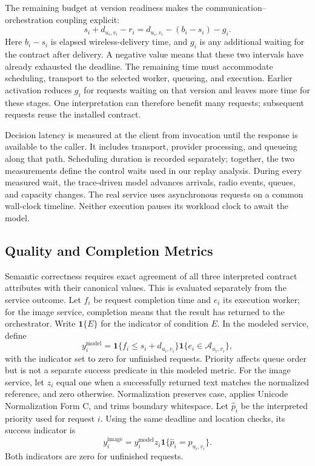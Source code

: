 The remaining budget at version readiness makes the communication--orchestration coupling explicit:
\begin{equation}
s_i+d_{u_i,v_i}-r_i
=d_{u_i,v_i}-(b_i-s_i)-g_i.
\label{eq:remaining-budget}
\end{equation}
Here $b_i-s_i$ is elapsed wireless-delivery time, and $g_i$ is any additional waiting for the contract after delivery. A negative value means that these two intervals have already exhausted the deadline. The remaining time must accommodate scheduling, transport to the selected worker, queueing, and execution. Earlier activation reduces $g_i$ for requests waiting on that version and leaves more time for these stages. One interpretation can therefore benefit many requests; subsequent requests reuse the installed contract.

Decision latency is measured at the client from invocation until the response is available to the caller. It includes transport, provider processing, and queueing along that path. Scheduling duration is recorded separately; together, the two measurements define the control waits used in our replay analysis. During every measured wait, the trace-driven model advances arrivals, radio events, queues, and capacity changes. The real service uses asynchronous requests on a common wall-clock timeline. Neither execution pauses its workload clock to await the model.

\subsection{Quality and Completion Metrics}
Semantic correctness requires exact agreement of all three interpreted contract attributes with their canonical values. This is evaluated separately from the service outcome.
Let $f_i$ be request completion time and $e_i$ its execution worker; for the image service, completion means that the result has returned to the orchestrator. Write $\mathbf{1}\{E\}$ for the indicator of condition $E$. In the modeled service, define
\begin{equation}
y_i^{\mathrm{model}}=
\mathbf{1}\{f_i\le s_i+d_{u_i,v_i}\}
\mathbf{1}\{e_i\in\mathcal A_{u_i,v_i}\},
\label{eq:success}
\end{equation}
with the indicator set to zero for unfinished requests. Priority affects queue order but is not a separate success predicate in this modeled metric. For the image service, let $z_i$ equal one when a successfully returned text matches the normalized reference, and zero otherwise. Normalization preserves case, applies Unicode Normalization Form C, and trims boundary whitespace. Let $\widehat p_i$ be the interpreted priority used for request $i$. Using the same deadline and location checks, its success indicator is
\begin{equation}
y_i^{\mathrm{image}}=y_i^{\mathrm{model}}z_i
\mathbf{1}\{\widehat p_i=p_{u_i,v_i}\}.
\label{eq:image-success}
\end{equation}
Both indicators are zero for unfinished requests.

